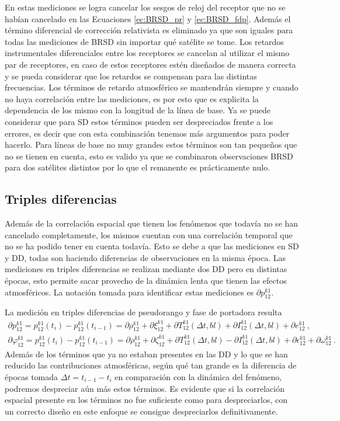 \documentclass[a4paper,12pt,oneside,onecolumn,final,openright]{book}%
\begin{document}
	En estas mediciones se logra cancelar los sesgos de reloj del receptor que no se habían cancelado en las Ecuaciones \eqref{ec:BRSD_pr} y \eqref{ec:BRSD_fdp}. Además el término diferencial de corrección relativista es eliminado ya que son iguales para todas las mediciones de BRSD sin importar qué satélite se tome. Los retardos instrumentales diferenciales entre los receptores se cancelan al utilizar el mismo par de receptores, en caso de estos receptores estén diseñados de manera correcta y se pueda considerar que los retardos se compensan para las distintas frecuencias. Los términos de retardo atmosférico se mantendrán siempre y cuando no haya correlación entre las mediciones, es por esto que es explicita la dependencia de los mismo con la longitud de la línea de base. Ya se puede considerar que para SD estos términos pueden ser despreciados frente a los errores, es decir que con esta combinación tenemos más argumentos para poder hacerlo. Para líneas de base no muy grandes estos términos son tan pequeños que no se tienen en cuenta, esto es valido ya que se combinaron observaciones BRSD para dos satélites distintos por lo que el remanente es prácticamente nulo.

\subsection{Triples diferencias}
	Además de la correlación espacial que tienen los fenómenos que todavía no se han cancelado completamente, los mismos cuentan con una correlación temporal que no se ha podido tener en cuenta todavía. Esto se debe a que las mediciones en SD y DD, todas son haciendo diferencias de observaciones en la misma época. Las mediciones en triples diferencias se realizan mediante dos DD pero en distintas épocas, esto permite sacar provecho de la dinámica lenta que tienen las efectos atmosféricos. La notación tomada para identificar estas mediciones es $\partial p_{12}^{k1}$.
	
	La medición en triples diferencias de pseudorango y fase de portadora resulta
\begin{align}
	\partial p_{12}^{k1} = p_{12}^{k1}(t_i) - p_{12}^{k1}(t_{i-1}) = \partial\rho_{12}^{k1} + \partial\xi_{12}^{k1} + \partial T_{12}^{k1}(\Delta t,bl) + \partial I_{12}^{k1}(\Delta t,bl) + \partial e_{12}^{k1} \ ,
\end{align}
\begin{align}
	\partial \varphi_{12}^{k1} = p_{12}^{k1}(t_i) - p_{12}^{k1}(t_{i-1}) = \partial\rho_{12}^{k1} + \partial\zeta_{12}^{k1} + \partial T_{12}^{k1}(\Delta t,bl) - \partial I_{12}^{k1}(\Delta t,bl) + \partial \epsilon_{12}^{k1} + \partial\omega_{12}^{k1}\ .
\end{align}
	Además de los términos que ya no estaban presentes en las DD y lo que se han reducido las contribuciones atmosféricas, según qué tan grande es la diferencia de épocas tomada $\Delta t = t_{i-1}-t_i$ en comparación con la dinámica del fenómeno, podremos despreciar aún más estos términos. Es evidente que si la correlación espacial presente en los términos no fue suficiente como para despreciarlos, con un correcto diseño en este enfoque se consigue despreciarlos definitivamente.
\end{document}
